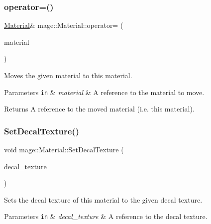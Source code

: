 \subsubsection{\texorpdfstring{operator=()}{operator=()}\hspace{0.1cm}{\footnotesize\ttfamily [2/2]}}
{\footnotesize\ttfamily \hyperlink{structmage_1_1_material}{Material}\& mage\+::\+Material\+::operator= (\begin{DoxyParamCaption}\item[{\hyperlink{structmage_1_1_material}{Material} \&\&}]{material }\end{DoxyParamCaption})\hspace{0.3cm}{\ttfamily [default]}}

Moves the given material to this material.


\begin{DoxyParams}[1]{Parameters}
\mbox{\tt in}  & {\em material} & A reference to the material to move. \\
\hline
\end{DoxyParams}
\begin{DoxyReturn}{Returns}
A reference to the moved material (i.\+e. this material). 
\end{DoxyReturn}
\hypertarget{structmage_1_1_material_a68207beea9dcea8a6921f89e4b5d0950}{}\label{structmage_1_1_material_a68207beea9dcea8a6921f89e4b5d0950} 
\subsubsection{\texorpdfstring{Set\+Decal\+Texture()}{SetDecalTexture()}}
{\footnotesize\ttfamily void mage\+::\+Material\+::\+Set\+Decal\+Texture (\begin{DoxyParamCaption}\item[{const \hyperlink{namespacemage_a1e01ae66713838a7a67d30e44c67703e}{Shared\+Ptr}$<$ const \hyperlink{classmage_1_1_texture}{Texture} $>$ \&}]{decal\+\_\+texture }\end{DoxyParamCaption})}

Sets the decal texture of this material to the given decal texture.


\begin{DoxyParams}[1]{Parameters}
\mbox{\tt in}  & {\em decal\+\_\+texture} & A reference to the decal texture. \\
\hline
\end{DoxyParams}
\hypertarget{structmage_1_1_material_aef82ef4eba08eabc31989144316a57c6}{}\label{structmage_1_1_material_aef82ef4eba08eabc31989144316a57c6} 
